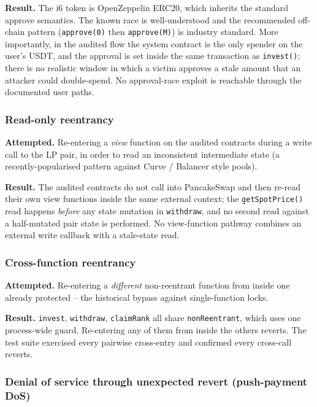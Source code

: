 \documentclass[11pt,a4paper]{article}
\begin{document}
\textbf{Result.} The i6 token is OpenZeppelin ERC20, which inherits the
standard approve semantics. The known race is well-understood and the
recommended off-chain pattern (\texttt{approve(0)} then
\texttt{approve(M)}) is industry standard. More importantly, in the audited
flow the system contract is the only spender on the user's USDT, and the
approval is set inside the same transaction as \texttt{invest()}; there is
no realistic window in which a victim approves a stale amount that an
attacker could double-spend. No approval-race exploit is reachable through
the documented user paths.

\subsubsection*{Read-only reentrancy}

\textbf{Attempted.} Re-entering a \emph{view} function on the audited
contracts during a write call to the LP pair, in order to read an
inconsistent intermediate state (a recently-popularised pattern against
Curve / Balancer style pools).

\textbf{Result.} The audited contracts do not call into PancakeSwap and then
re-read their own view functions inside the same external context; the
\texttt{getSpotPrice()} read happens \emph{before} any state mutation in
\texttt{withdraw}, and no second read against a half-mutated pair state is
performed. No view-function pathway combines an external write callback
with a stale-state read.

\subsubsection*{Cross-function reentrancy}

\textbf{Attempted.} Re-entering a \emph{different} non-reentrant function
from inside one already protected -- the historical bypass against
single-function locks.

\textbf{Result.} \texttt{invest}, \texttt{withdraw}, \texttt{claimRank} all
share \texttt{nonReentrant}, which uses one process-wide guard. Re-entering
any of them from inside the others reverts. The test suite exercised every
pairwise cross-entry and confirmed every cross-call reverts.

\subsubsection*{Denial of service through unexpected revert (push-payment DoS)}
\end{document}
